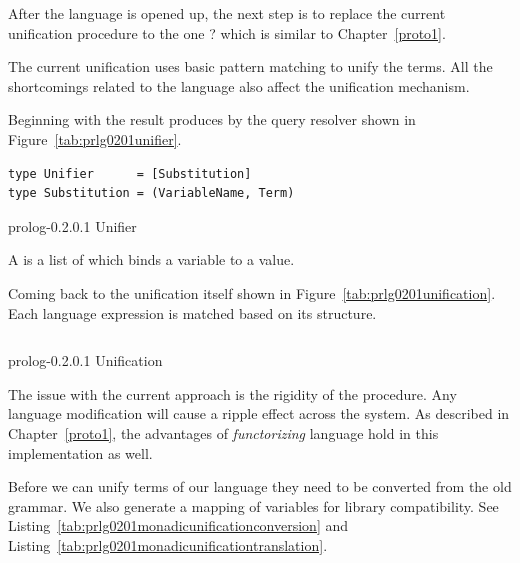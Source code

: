 \documentclass[thesis-solanki.tex]{subfiles}
\begin{document}
After the language is opened up, the next step is to replace the current unification procedure to the one {\Huge
  ?} which is similar to Chapter~\ref{proto1}.


The current unification uses basic pattern matching to unify the terms.
All the shortcomings related to the language also affect the unification mechanism.

Beginning with the result produces by the query resolver shown in Figure~\ref{tab:prlg0201unifier}.
\begin{code-list}[h]
\begin{verbatim}
type Unifier      = [Substitution]
type Substitution = (VariableName, Term)
\end{verbatim}
\caption{prolog-0.2.0.1 Unifier}
\label{tab:prlg0201unifier}
\end{code-list}
A  is a list of  which binds a variable to a value.

Coming back to the unification itself shown in Figure~\ref{tab:prlg0201unification}.
Each language expression is matched based on its structure.

\begin{code-list}[th]
  \begin{singlespace}
    \inputminted[linenos]{haskell}{haskell-proto2-unification-lion.hs}
  \end{singlespace}
\caption{prolog-0.2.0.1 Unification}
\label{tab:prlg0201unification}
\end{code-list}

The issue with the current approach is the rigidity of the procedure.
Any language modification will cause a ripple effect across the system.
As described in Chapter~\ref{proto1}, the advantages of \textit{functorizing} language hold in this implementation
as well.

Before we can unify terms of our language they need to be converted from the old grammar. We also generate a mapping of variables for 
library compatibility. See Listing~\ref{tab:prlg0201monadicunificationconversion} and 
Listing~\ref{tab:prlg0201monadicunificationtranslation}.
\end{document}
